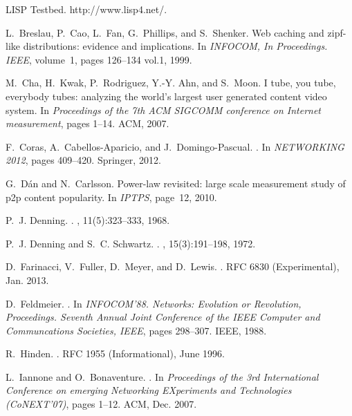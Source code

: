 \documentclass[twocolumn, 10pt]{article}
\theoremstyle{plain}
\begin{document}
\small
\begin{thebibliography}{10}

{LISP Testbed}.
\newblock http://www.lisp4.net/.

L.~Breslau, P.~Cao, L.~Fan, G.~Phillips, and S.~Shenker.
\newblock Web caching and zipf-like distributions: evidence and implications.
\newblock In {\em INFOCOM, In Proceedings. IEEE}, volume~1, pages 126--134
  vol.1, 1999.

M.~Cha, H.~Kwak, P.~Rodriguez, Y.-Y. Ahn, and S.~Moon.
\newblock I tube, you tube, everybody tubes: analyzing the world's largest user
  generated content video system.
\newblock In {\em Proceedings of the 7th ACM SIGCOMM conference on Internet
  measurement}, pages 1--14. ACM, 2007.

F.~Coras, A.~Cabellos-Aparicio, and J.~Domingo-Pascual.
.
\newblock In {\em NETWORKING 2012}, pages 409--420. Springer, 2012.

G.~D{\'a}n and N.~Carlsson.
\newblock Power-law revisited: large scale measurement study of p2p content
  popularity.
\newblock In {\em IPTPS}, page~12, 2010.

P.~J. Denning.
.
, 11(5):323--333, 1968.

P.~J. Denning and S.~C. Schwartz.
.
, 15(3):191--198, 1972.

D.~Farinacci, V.~Fuller, D.~Meyer, and D.~Lewis.
.
\newblock RFC 6830 (Experimental), Jan. 2013.

D.~Feldmeier.
.
\newblock In {\em INFOCOM'88. Networks: Evolution or Revolution, Proceedings.
  Seventh Annual Joint Conference of the IEEE Computer and Communcations
  Societies, IEEE}, pages 298--307. IEEE, 1988.

R.~Hinden.
.
\newblock RFC 1955 (Informational), June 1996.

L.~Iannone and O.~Bonaventure.
.
\newblock In {\em Proceedings of the 3rd International Conference on emerging
  Networking EXperiments and Technologies (CoNEXT'07)}, pages 1--12. ACM, Dec.
  2007.


\end{thebibliography}
\end{document}
